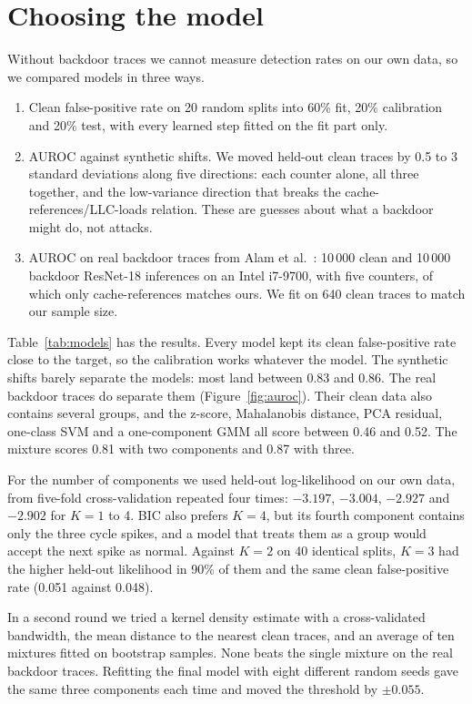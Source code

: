 \documentclass[11pt,a4paper]{article}
\begin{document}
\section{Choosing the model}

Without backdoor traces we cannot measure detection rates on our own data, so we compared models in three ways.
\begin{enumerate}
  \item Clean false-positive rate on 20 random splits into 60\% fit, 20\% calibration and 20\% test, with every
        learned step fitted on the fit part only.
  \item AUROC against synthetic shifts. We moved held-out clean traces by 0.5 to 3 standard deviations along five
        directions: each counter alone, all three together, and the low-variance direction that breaks the
        cache-references/LLC-loads relation. These are guesses about what a backdoor might do, not attacks.
  \item AUROC on real backdoor traces from Alam et al.~\cite{alam2024}: 10\,000 clean and 10\,000 backdoor
        ResNet-18 inferences on an Intel i7-9700, with five counters, of which only cache-references matches
        ours. We fit on 640 clean traces to match our sample size.
\end{enumerate}

Table~\ref{tab:models} has the results. Every model kept its clean false-positive rate close to the target, so the
calibration works whatever the model. The synthetic shifts barely separate the models: most land between 0.83 and
0.86. The real backdoor traces do separate them (Figure~\ref{fig:auroc}). Their clean data also contains several
groups, and the z-score, Mahalanobis distance, PCA residual, one-class SVM and a one-component GMM all score
between 0.46 and 0.52. The mixture scores 0.81 with two components and 0.87 with three.

For the number of components we used held-out log-likelihood on our own data, from five-fold cross-validation
repeated four times: $-3.197$, $-3.004$, $-2.927$ and $-2.902$ for $K = 1$ to 4. BIC also prefers $K = 4$, but
its fourth component contains only the three cycle spikes, and a model that treats them as a group would accept
the next spike as normal. Against $K = 2$ on 40 identical splits, $K = 3$ had the higher held-out likelihood in
90\% of them and the same clean false-positive rate (0.051 against 0.048).

In a second round we tried a kernel density estimate with a cross-validated bandwidth, the mean distance to the
nearest clean traces, and an average of ten mixtures fitted on bootstrap samples. None beats the single mixture on
the real backdoor traces. Refitting the final model with eight different random seeds gave the same three
components each time and moved the threshold by $\pm 0.055$.
\end{document}
